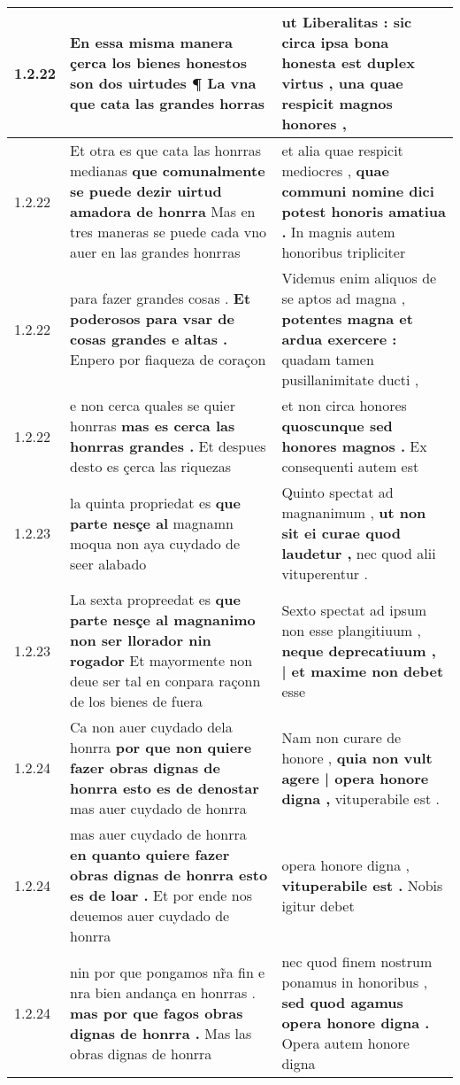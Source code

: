 \begin{tabular}{|p{1cm}|p{6.5cm}|p{6.5cm}|}
1.2.22 & En essa misma manera \textbf{ çerca los bienes honestos son dos uirtudes ¶ } La vna que cata las grandes horras & ut Liberalitas : \textbf{ sic circa ipsa bona honesta est duplex virtus , } una quae respicit magnos honores , \\\hline
1.2.22 & Et otra es que cata las honrras medianas \textbf{ que comunalmente se puede dezir uirtud amadora de honrra } Mas en tres maneras se puede cada vno auer en las grandes honrras & et alia quae respicit mediocres , \textbf{ quae communi nomine dici potest honoris amatiua . } In magnis autem honoribus tripliciter \\\hline
1.2.22 & para fazer grandes cosas . \textbf{ Et poderosos para vsar de cosas grandes e altas . } Enpero por fiaqueza de coraçon & Videmus enim aliquos de se aptos ad magna , \textbf{ potentes magna et ardua exercere : } quadam tamen pusillanimitate ducti , \\\hline
1.2.22 & e non cerca quales se quier honrras \textbf{ mas es cerca las honrras grandes . } Et despues desto es çerca las riquezas & et non circa honores \textbf{ quoscunque sed honores magnos . } Ex consequenti autem est \\\hline
1.2.23 & la quinta propriedat es \textbf{ que parte nesçe al } magnamn moqua non aya cuydado de seer alabado & Quinto spectat ad magnanimum , \textbf{ ut non sit ei curae quod laudetur , } nec quod alii vituperentur . \\\hline
1.2.23 & La sexta propreedat es \textbf{ que parte nesçe al magnanimo non ser llorador nin rogador } Et mayormente non deue ser tal en conpara raçonn de los bienes de fuera & Sexto spectat ad ipsum non esse plangitiuum , \textbf{ neque deprecatiuum , | et maxime non debet } esse \\\hline
1.2.24 & Ca non auer cuydado dela honrra \textbf{ por que non quiere fazer obras dignas de honrra esto es de denostar } mas auer cuydado de honrra & Nam non curare de honore , \textbf{ quia non vult agere | opera honore digna , } vituperabile est . \\\hline
1.2.24 & mas auer cuydado de honrra \textbf{ en quanto quiere fazer obras dignas de honrra esto es de loar . } Et por ende nos deuemos auer cuydado de honrra & opera honore digna , \textbf{ vituperabile est . } Nobis igitur debet \\\hline
1.2.24 & nin por que pongamos nr̃a fin e nra bien andança en honrras . \textbf{ mas por que fagos obras dignas de honrra . } Mas las obras dignas de honrra & nec quod finem nostrum ponamus in honoribus , \textbf{ sed quod agamus opera honore digna . } Opera autem honore digna \\\hline

\end{tabular}

